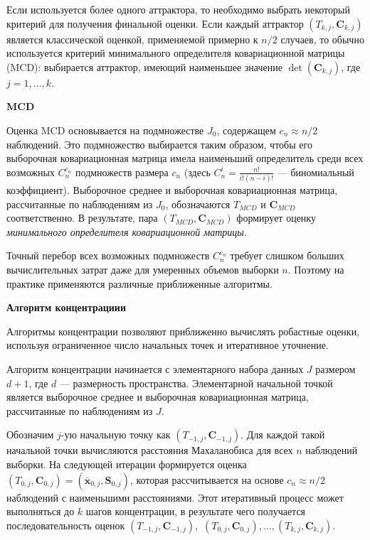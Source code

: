 Если используется более одного аттрактора, то необходимо выбрать некоторый критерий для получения финальной оценки. Если каждый аттрактор $(T_{k,j}, \mathbf{C}_{k,j})$ является классической оценкой, применяемой примерно к $n/2$ случаев, то обычно используется критерий минимального определителя ковариационной матрицы (MCD): выбирается аттрактор, имеющий наименьшее значение $\det(\mathbf{C}_{k,j})$, где $j=1, \ldots, k$.

\vspace{1.5ex}

\textbf{MCD}

Оценка MCD основывается на подмножестве $J_0$, содержащем $c_n \approx n/2$ наблюдений. Это подмножество выбирается таким образом, чтобы его выборочная ковариационная матрица имела наименьший определитель среди всех возможных $C_n^{c_n}$ подмножеств размера $c_n$ (здесь $C_n^i = \frac{n!}{i! (n-i)!}$ ---  биномиальный коэффициент). Выборочное среднее и выборочная ковариационная матрица, рассчитанные по наблюдениям из $J_0$, обозначаются $T_{MCD}$ и $\mathbf{C}_{MCD}$ соответственно. В результате, пара $(T_{MCD}, \mathbf{C}_{MCD})$ формирует оценку \textit{минимального определителя ковариационной матрицы}.

Точный перебор всех возможных подмножеств $C_n^{c_n}$ требует слишком больших вычислительных затрат даже для умеренных объемов выборки  $n$. Поэтому на практике применяются различные приближенные алгоритмы.

\vspace{1.5ex}

\textbf{Алгоритм концентрациии}

Алгоритмы концентрации позволяют приближенно вычислять робастные оценки, используя ограниченное число начальных точек и итеративное уточнение.

Алгоритм концентрации начинается с элементарного набора данных $J$ размером $d+1$, где $d$ --- размерность пространства. Элементарной начальной точкой является выборочное среднее и выборочная ковариационная матрица, рассчитанные по наблюдениям из $J$.

Обозначим $j$-ую начальную точку как $(T_{-1,j}, \mathbf{C}_{-1,j})$. Для каждой такой начальной точки вычисляются расстояния Махаланобиса для всех $n$ наблюдений выборки. На следующей итерации формируется оценка $(T_{0,j}, \mathbf{C}_{0,j})=(\bar{\mathbf{x}}_{0,j}, \widehat{\mathbf{S}}_{0,j})$, которая рассчитывается на основе $c_n \approx n/2$ наблюдений с наименьшими расстояниями. Этот итеративный процесс может выполняться до $k$ шагов концентрации, в результате чего получается последовательность оценок $(T_{-1,j}, \mathbf{C}_{-1,j}),$ $(T_{0,j}, \mathbf{C}_{0,j}),\ldots, (T_{k,j}, \mathbf{C}_{k,j})$. 

